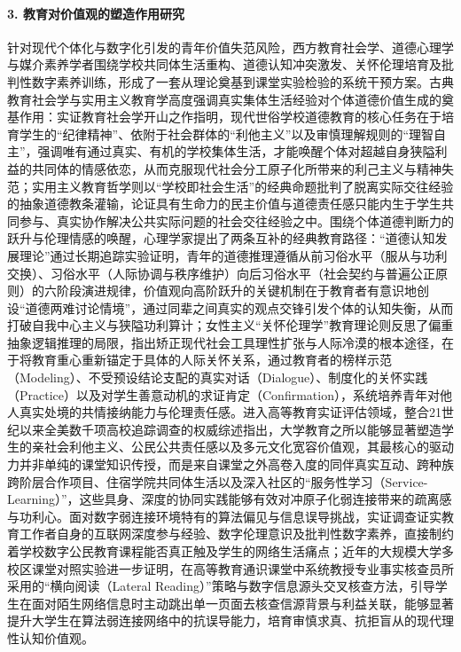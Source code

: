 \paragraph{3. 教育对价值观的塑造作用研究}
针对现代个体化与数字化引发的青年价值失范风险，西方教育社会学、道德心理学与媒介素养学者围绕学校共同体生活重构、道德认知冲突激发、关怀伦理培育及批判性数字素养训练，形成了一套从理论奠基到课堂实验检验的系统干预方案。古典教育社会学与实用主义教育学高度强调真实集体生活经验对个体道德价值生成的奠基作用：实证教育社会学开山之作指明，现代世俗学校道德教育的核心任务在于培育学生的“纪律精神”、依附于社会群体的“利他主义”以及审慎理解规则的“理智自主”，强调唯有通过真实、有机的学校集体生活，才能唤醒个体对超越自身狭隘利益的共同体的情感依恋，从而克服现代社会分工原子化所带来的利己主义与精神失范\cite{Durkheim2001}；实用主义教育哲学则以“学校即社会生活”的经典命题批判了脱离实际交往经验的抽象道德教条灌输，论证具有生命力的民主价值与道德责任感只能内生于学生共同参与、真实协作解决公共实际问题的社会交往经验之中\cite{Dewey2013}。围绕个体道德判断力的跃升与伦理情感的唤醒，心理学家提出了两条互补的经典教育路径：“道德认知发展理论”通过长期追踪实验证明，青年的道德推理遵循从前习俗水平（服从与功利交换）、习俗水平（人际协调与秩序维护）向后习俗水平（社会契约与普遍公正原则）的六阶段演进规律，价值观向高阶跃升的关键机制在于教育者有意识地创设“道德两难讨论情境”，通过同辈之间真实的观点交锋引发个体的认知失衡，从而打破自我中心主义与狭隘功利算计\cite{Kohlberg1981}；女性主义“关怀伦理学”教育理论则反思了偏重抽象逻辑推理的局限，指出矫正现代社会工具理性扩张与人际冷漠的根本途径，在于将教育重心重新锚定于具体的人际关怀关系，通过教育者的榜样示范（Modeling）、不受预设结论支配的真实对话（Dialogue）、制度化的关怀实践（Practice）以及对学生善意动机的求证肯定（Confirmation），系统培养青年对他人真实处境的共情接纳能力与伦理责任感\cite{Noddings2013}。进入高等教育实证评估领域，整合21世纪以来全美数千项高校追踪调查的权威综述指出，大学教育之所以能够显著塑造学生的亲社会利他主义、公民公共责任感以及多元文化宽容价值观，其最核心的驱动力并非单纯的课堂知识传授，而是来自课堂之外高卷入度的同伴真实互动、跨种族跨阶层合作项目、住宿学院共同体生活以及深入社区的“服务性学习（Service-Learning）”，这些具身、深度的协同实践能够有效对冲原子化弱连接带来的疏离感与功利心\cite{Mayhew2016}。面对数字弱连接环境特有的算法偏见与信息误导挑战，实证调查证实教育工作者自身的互联网深度参与经验、数字伦理意识及批判性数字素养，直接制约着学校数字公民教育课程能否真正触及学生的网络生活痛点\cite{Choi2018}；近年的大规模大学多校区课堂对照实验进一步证明，在高等教育通识课堂中系统教授专业事实核查员所采用的“横向阅读（Lateral Reading）”策略与数字信息源头交叉核查方法，引导学生在面对陌生网络信息时主动跳出单一页面去核查信源背景与利益关联，能够显著提升大学生在算法弱连接网络中的抗误导能力，培育审慎求真、抗拒盲从的现代理性认知价值观\cite{Wineburg2022}。

